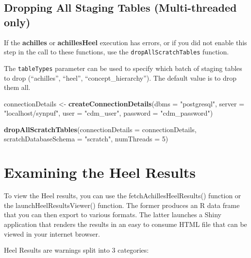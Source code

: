 \documentclass[]{article}
\newenvironment{Shaded}{\begin{snugshade}}{\end{snugshade}}
\newcommand{\KeywordTok}[1]{\textcolor[rgb]{0.13,0.29,0.53}{\textbf{#1}}}
\newcommand{\DataTypeTok}[1]{\textcolor[rgb]{0.13,0.29,0.53}{#1}}
\newcommand{\DecValTok}[1]{\textcolor[rgb]{0.00,0.00,0.81}{#1}}
\newcommand{\StringTok}[1]{\textcolor[rgb]{0.31,0.60,0.02}{#1}}
\newcommand{\NormalTok}[1]{#1}
\begin{document}
\subsection{Dropping All Staging Tables (Multi-threaded
only)}\label{dropping-all-staging-tables-multi-threaded-only}

If the \textbf{achilles} or \textbf{achillesHeel} execution has errors,
or if you did not enable this step in the call to these functions, use
the \texttt{dropAllScratchTables} function.

The \texttt{tableTypes} parameter can be used to specify which batch of
staging tables to drop (``achilles'', ``heel'', ``concept\_hierarchy'').
The default value is to drop them all.

\begin{Shaded}
\begin{Highlighting}[]
\NormalTok{connectionDetails <-}\StringTok{ }\KeywordTok{createConnectionDetails}\NormalTok{(}\DataTypeTok{dbms =} \StringTok{"postgresql"}\NormalTok{, }
                                             \DataTypeTok{server =} \StringTok{"localhost/synpuf"}\NormalTok{, }
                                             \DataTypeTok{user =} \StringTok{"cdm_user"}\NormalTok{, }
                                             \DataTypeTok{password =} \StringTok{"cdm_password"}\NormalTok{)}

\KeywordTok{dropAllScratchTables}\NormalTok{(}\DataTypeTok{connectionDetails =}\NormalTok{ connectionDetails, }
                     \DataTypeTok{scratchDatabaseSchema =} \StringTok{"scratch"}\NormalTok{, }\DataTypeTok{numThreads =} \DecValTok{5}\NormalTok{)}
\end{Highlighting}
\end{Shaded}

\section{Examining the Heel Results}\label{examining-the-heel-results}

To view the Heel results, you can use the fetchAchillesHeelResults()
function or the launchHeelResultsViewer() function. The former produces
an R data frame that you can then export to various formats. The latter
launches a Shiny application that renders the results in an easy to
consume HTML file that can be viewed in your internet browser.

Heel Results are warnings split into 3 categories:
\end{document}

